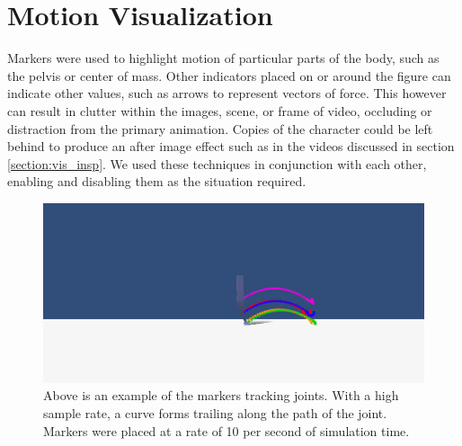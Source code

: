 \section{Motion Visualization}
\label{section:motion_vis}

Markers were used to highlight motion of particular parts of the body, such as the pelvis or center of mass.  Other indicators placed on or around the figure can indicate other values, such as arrows to represent vectors of force.  This however can result in clutter within the images, scene, or frame of video, occluding or distraction from the primary animation.  Copies of the character could be left behind to produce an after image effect such as in the videos discussed in section \ref{section:vis_insp}.  We used these techniques in conjunction with each other, enabling and disabling them as the situation required.


\begin{figure}[ht]
	\centering
	\includegraphics[width=\textwidth]{images/trails/trail-side.png}
	\caption[Marker trail visualization of motion]{Above is an example of the markers tracking joints.  With a high sample rate, a curve forms trailing along the path of the joint.  Markers were placed at a rate of 10 per second of simulation time.}
	\label{fig:marker_trails}
\end{figure}


